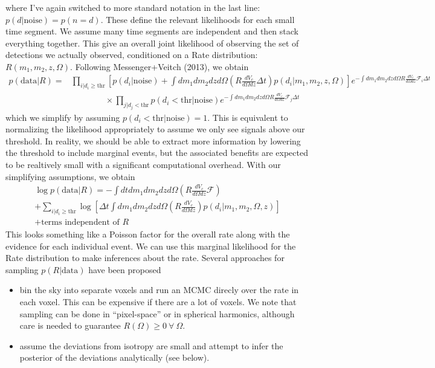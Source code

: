 \documentclass{article}
\begin{document}
where I've again switched to more standard notation in the last line: $p(d|\mathrm{noise}) = p(n=d)$.
These define the relevant likelihoods for each small time segment.
We assume many time segments are independent and then stack everything together.
This give an overall joint likelihood of observing the set of detections we actually observed, conditioned on a Rate distribution: $R(m_1, m_2, z, \Omega)$.
Following Messenger+Veitch (2013), we obtain
\begin{align}
    p(\mathrm{data}|R) = & \prod\limits_{i|d_i\geq\mathrm{thr}} \left[ p(d_i|\mathrm{noise}) + \int dm_1 dm_2 dz d\Omega \left( R\frac{dV_c}{d\Omega dz} \Delta t \right) p(d_i|m_1, m_2, z, \Omega) \right] e^{-\int dm_1 dm_2 dz d\Omega R\frac{dV_c}{d\Omega dz} \mathcal{F}_i \Delta t} \nonumber \\
                         & \quad\quad\quad\quad \times \prod\limits_{j|d_j<\mathrm{thr}} p(d_i<\mathrm{thr}|\mathrm{noise}) e^{-\int dm_1 dm_2 dz d\Omega R\frac{dV_c}{d\Omega dz} \mathcal{F}_j \Delta t} 
\end{align}
which we simplify by assuming $p(d_i<\mathrm{thr}|\mathrm{noise}) =1$.
This is equivalent to normalizing the likelihood appropriately to assume we only see signals above our threshold. 
In reality, we should be able to extract more information by lowering the threshold to include marginal events, but the associated benefits are expected to be realtively small with a significant computational overhead.
With our simplifying assumptions, we obtain
\begin{multline}
    \log p(\mathrm{data}|R) = - \int dt dm_1 dm_2 dz d\Omega \left(R \frac{dV_c}{d\Omega dz} \mathcal{F}\right) \\
         + \sum\limits_{i|d_i\geq\mathrm{thr}} \log \left[ \Delta t \int dm_1 dm_2 dz d\Omega \left(R \frac{dV_c}{d\Omega dz} \right) p(d_i|m_1, m_2, \Omega, z) \right] \\
         + \text{terms independent of }R
\end{multline}
This looks something like a Poisson factor for the overall rate along with the evidence for each individual event.
We can use this marginal likelihood for the Rate distribution to make inferences about the rate.
Several approaches for sampling $p(R|\mathrm{data})$ have been proposed
\begin{itemize}
    \item bin the sky into separate voxels and run an MCMC direcly over the rate in each voxel. This can be expensive if there are a lot of voxels. We note that sampling can be done in ``pixel-space'' or in spherical harmonics, although care is needed to guarantee $R(\Omega) \geq 0\ \forall\ \Omega$.
    \item assume the deviations from isotropy are small and attempt to infer the posterior of the deviations analytically (see below).
\end{itemize}
\end{document}

